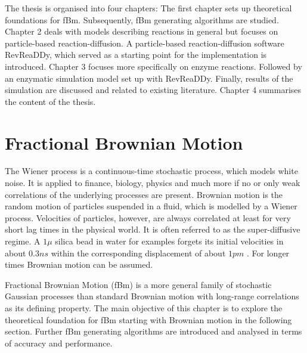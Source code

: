 \documentclass[
  a4paper,BCOR10mm,oneside,
  headsepline,footsepline,%
  fleqn,openbib
]{scrbook}
\begin{document}
\par The thesis is organised into four chapters: The first chapter sets up theoretical foundations for fBm. Subsequently, fBm generating algorithms are studied. Chapter 2 deals with models describing reactions in general but focuses on particle-based reaction-diffusion. A particle-based reaction-diffusion software RevReaDDy, which served as a starting point for the implementation is introduced.  Chapter 3 focuses more specifically on enzyme reactions. Followed by an enzymatic simulation model set up with RevReaDDy. Finally, results of the simulation are discussed and related to existing literature. Chapter 4 summarises the content of the thesis. 
\chapter{Fractional Brownian Motion}
The Wiener process is a continuous-time stochastic process, which models white noise. It is applied to finance, biology, physics and much more if no or only weak correlations of the underlying processes are present. Brownian motion is the random motion of particles suspended in a fluid, which is modelled by a Wiener process. Velocities of particles, however, are always correlated at least for very short lag times in the physical world. It is often referred to as the super-diffusive regime. A $1 \mu $  silica bead in water for examples forgets its initial velocities in about $0.3ns$ within the corresponding displacement of about $1pm$ \cite{Huang2011}. For longer times Brownian motion can be assumed.\par
Fractional Brownian Motion (fBm) is a more general family of stochastic Gaussian processes than standard Brownian motion with long-range correlations as its defining property. The main objective of this chapter is to explore the theoretical foundation for fBm starting with Brownian motion in the following section. Further fBm generating algorithms are introduced and analysed in terms of accuracy and performance.    
\end{document}
